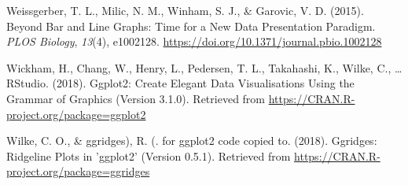 \documentclass[british,man]{apa6}
\begin{document}
\leavevmode\hypertarget{ref-weissgerberBarLineGraphs2015}{}%
Weissgerber, T. L., Milic, N. M., Winham, S. J., \& Garovic, V. D. (2015). Beyond Bar and Line Graphs: Time for a New Data Presentation Paradigm. \emph{PLOS Biology}, \emph{13}(4), e1002128. \url{https://doi.org/10.1371/journal.pbio.1002128}

\leavevmode\hypertarget{ref-wickhamGgplot2CreateElegant2018}{}%
Wickham, H., Chang, W., Henry, L., Pedersen, T. L., Takahashi, K., Wilke, C., \ldots{} RStudio. (2018). Ggplot2: Create Elegant Data Visualisations Using the Grammar of Graphics (Version 3.1.0). Retrieved from \url{https://CRAN.R-project.org/package=ggplot2}

\leavevmode\hypertarget{ref-wilkeGgridgesRidgelinePlots2018}{}%
Wilke, C. O., \& ggridges), R. (. for ggplot2 code copied to. (2018). Ggridges: Ridgeline Plots in 'ggplot2' (Version 0.5.1). Retrieved from \url{https://CRAN.R-project.org/package=ggridges}

\endgroup
\end{document}
